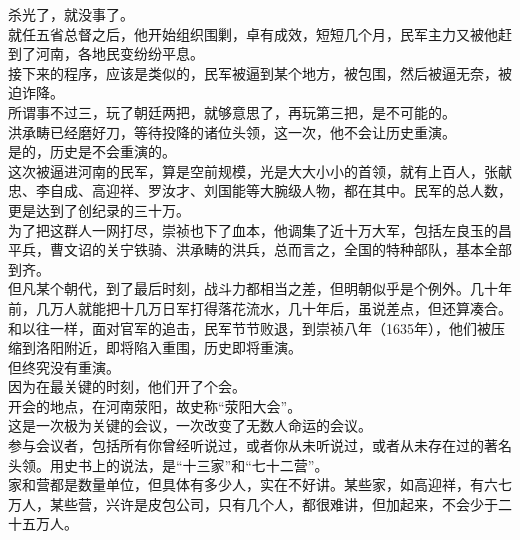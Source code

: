 \begin{multicols}{\theparacolNo}
杀光了，就没事了。\\

就任五省总督之后，他开始组织围剿，卓有成效，短短几个月，民军主力又被他赶到了河南，各地民变纷纷平息。\\

接下来的程序，应该是类似的，民军被逼到某个地方，被包围，然后被逼无奈，被迫诈降。\\

所谓事不过三，玩了朝廷两把，就够意思了，再玩第三把，是不可能的。\\

洪承畴已经磨好刀，等待投降的诸位头领，这一次，他不会让历史重演。\\

是的，历史是不会重演的。\\

这次被逼进河南的民军，算是空前规模，光是大大小小的首领，就有上百人，张献忠、李自成、高迎祥、罗汝才、刘国能等大腕级人物，都在其中。民军的总人数，更是达到了创纪录的三十万。\\

为了把这群人一网打尽，崇祯也下了血本，他调集了近十万大军，包括左良玉的昌平兵，曹文诏的关宁铁骑、洪承畴的洪兵，总而言之，全国的特种部队，基本全部到齐。\\

但凡某个朝代，到了最后时刻，战斗力都相当之差，但明朝似乎是个例外。几十年前，几万人就能把十几万日军打得落花流水，几十年后，虽说差点，但还算凑合。\\

和以往一样，面对官军的追击，民军节节败退，到崇祯八年（1635年），他们被压缩到洛阳附近，即将陷入重围，历史即将重演。\\

但终究没有重演。\\

因为在最关键的时刻，他们开了个会。\\

开会的地点，在河南荥阳，故史称“荥阳大会”。\\

这是一次极为关键的会议，一次改变了无数人命运的会议。\\

参与会议者，包括所有你曾经听说过，或者你从未听说过，或者从未存在过的著名头领。用史书上的说法，是“十三家”和“七十二营”。\\

家和营都是数量单位，但具体有多少人，实在不好讲。某些家，如高迎祥，有六七万人，某些营，兴许是皮包公司，只有几个人，都很难讲，但加起来，不会少于二十五万人。\\


\end{multicols}
